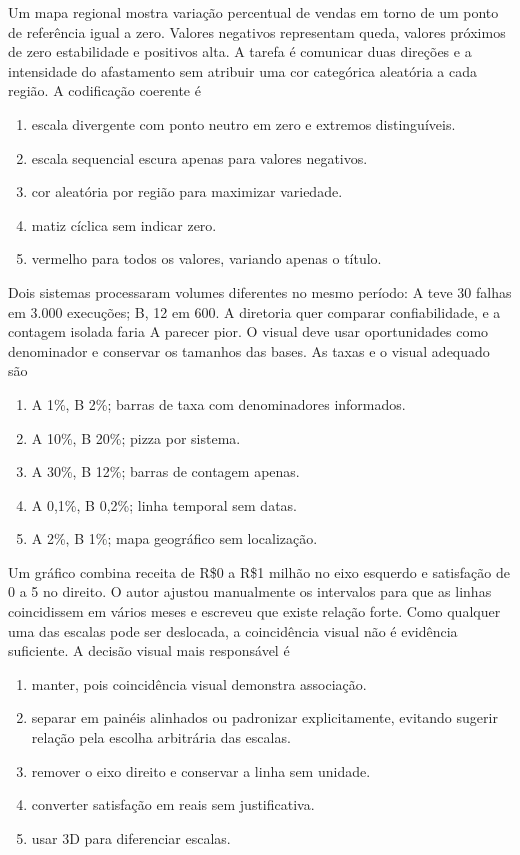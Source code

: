 \TextoBase Um mapa regional mostra variação percentual de vendas em torno de um ponto de referência igual a zero. Valores negativos representam queda, valores próximos de zero estabilidade e positivos alta. A tarefa é comunicar duas direções e a intensidade do afastamento sem atribuir uma cor categórica aleatória a cada região.
\FonteDidatica
\Comando A codificação coerente é
\begin{enumerate}[label=\Alph*)]\item escala divergente com ponto neutro em zero e extremos distinguíveis.\item escala sequencial escura apenas para valores negativos.\item cor aleatória por região para maximizar variedade.\item matiz cíclica sem indicar zero.\item vermelho para todos os valores, variando apenas o título.\end{enumerate}

\TextoBase Dois sistemas processaram volumes diferentes no mesmo período: A teve 30 falhas em 3.000 execuções; B, 12 em 600. A diretoria quer comparar confiabilidade, e a contagem isolada faria A parecer pior. O visual deve usar oportunidades como denominador e conservar os tamanhos das bases.
\FonteDidatica
\Comando As taxas e o visual adequado são
\begin{enumerate}[label=\Alph*)]\item A 1\%, B 2\%; barras de taxa com denominadores informados.\item A 10\%, B 20\%; pizza por sistema.\item A 30\%, B 12\%; barras de contagem apenas.\item A 0,1\%, B 0,2\%; linha temporal sem datas.\item A 2\%, B 1\%; mapa geográfico sem localização.\end{enumerate}

\TextoBase Um gráfico combina receita de R\$0 a R\$1 milhão no eixo esquerdo e satisfação de 0 a 5 no direito. O autor ajustou manualmente os intervalos para que as linhas coincidissem em vários meses e escreveu que existe relação forte. Como qualquer uma das escalas pode ser deslocada, a coincidência visual não é evidência suficiente.
\FonteDidatica
\Comando A decisão visual mais responsável é
\begin{enumerate}[label=\Alph*)]\item manter, pois coincidência visual demonstra associação.\item separar em painéis alinhados ou padronizar explicitamente, evitando sugerir relação pela escolha arbitrária das escalas.\item remover o eixo direito e conservar a linha sem unidade.\item converter satisfação em reais sem justificativa.\item usar 3D para diferenciar escalas.\end{enumerate}


